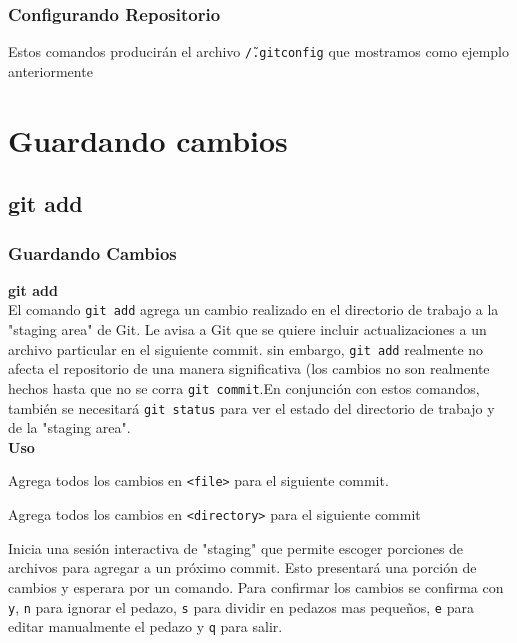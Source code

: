 \documentclass[8pt]{beamer}
\begin{document}

\begin{frame}
\frametitle{Configurando Repositorio}

Estos comandos producir\'an el archivo \texttt{\~/.gitconfig} que mostramos como ejemplo anteriormente
\end{frame}

\section{Guardando cambios}
\subsection{git add}
\begin{frame}
\frametitle{Guardando Cambios}
\textbf{git add}\\
\medskip
El comando \texttt{git add} agrega un cambio realizado en el directorio de trabajo a la "staging area" de Git. Le avisa a Git que se quiere incluir actualizaciones a un archivo particular en el siguiente commit. sin embargo, \texttt{git add} realmente no afecta el repositorio de una manera significativa (los cambios no son realmente hechos hasta que no se corra \texttt{git commit}.En conjunci\'on con estos comandos, tambi\'en se necesitar\'a \texttt{git status} para ver el estado del directorio de trabajo y de la "staging area".\\
\medskip
\textbf{Uso}

Agrega todos los cambios en \texttt{<file>} para el siguiente commit.

  Agrega todos los cambios en \texttt{<directory>} para el siguiente commit

Inicia una sesi\'on interactiva de "staging" que permite escoger porciones de archivos para agregar a un pr\'oximo commit. Esto presentar\'a una porci\'on de cambios y esperara por un comando. Para confirmar los cambios se confirma con \texttt{y}, \texttt{n} para ignorar el pedazo, \texttt{s} para dividir en pedazos mas pequeños, \texttt{e} para editar manualmente el pedazo y \texttt{q} para salir.
\end{frame}

\end{document}
